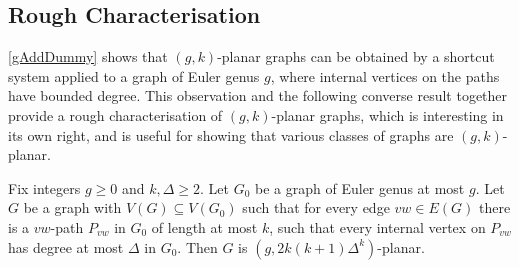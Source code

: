 \documentclass{patmorin}
\renewcommand{\geq}{\geqslant}
\begin{document}
\subsection{Rough Characterisation}
\label{Characterisation}

\cref{gAddDummy} shows that $(g,k)$-planar graphs can be obtained by a shortcut system applied to a graph of Euler genus $g$, where internal vertices on the paths have bounded degree. This observation and the following converse result together provide a rough characterisation of $(g,k)$-planar graphs, which is interesting in its own right, and is useful for showing that various classes of graphs are $(g,k)$-planar.

\begin{lem}
	\label{DrawG}
	Fix integers $g\geq 0$ and $k,\Delta\geq 2$.
	Let $G_0$ be a graph of Euler genus at most $g$. Let $G$ be
	a graph with $V(G) \subseteq V(G_0)$ such that for every edge $vw \in
	E(G)$ there is a $vw$-path $P_{vw}$ in $G_0$ of length at most $k$, such
	that every internal vertex on $P_{vw}$ has degree at most $\Delta$ in
	$G_0$. Then $G$ is $(g, 2k(k+1)\Delta^{k} )$-planar.
\end{lem}
\end{document}
